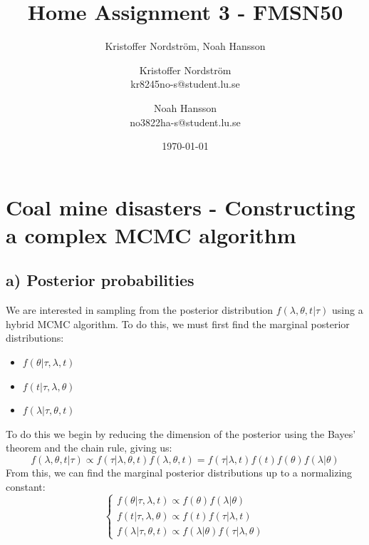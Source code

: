 \documentclass[a4paper]{article}
\title{Home Assignment 3 - FMSN50}
\author{Kristoffer Nordström, Noah Hansson}\author{Kristoffer Nordström \\ kr8245no-s@student.lu.se \and  Noah Hansson \\ no3822ha-s@student.lu.se}
\date{\today}
\begin{document}
\maketitle
\newpage

\section*{Coal mine disasters - Constructing a complex MCMC algorithm}


\subsection*{a) Posterior probabilities}
We are interested in sampling from the posterior distribution $f(\lambda, \theta, t | \tau)$ using a hybrid MCMC algorithm. To do this, we must first find the marginal posterior distributions:
\begin{itemize}
    \item $f(\theta | \tau, \lambda, t)$
    \item $f(t | \tau, \lambda, \theta)$
    \item $f(\lambda | \tau, \theta, t)$
\end{itemize}

To do this we begin by reducing the dimension of the posterior using the Bayes' theorem and the chain rule, giving us:
\begin{equation}
    f(\lambda, \theta, t | \tau) \propto f(\tau|\lambda, \theta, t)f(\lambda, \theta,t) = f(\tau|\lambda,t)f(t)f(\theta)f(\lambda|\theta)
\end{equation}
From this, we can find the marginal posterior distributions up to a normalizing constant:
\begin{equation}
    \begin{cases}
        f(\theta | \tau, \lambda, t) \propto f(\theta)f(\lambda|\theta) \\
        f(t | \tau, \lambda, \theta) \propto f(t)f(\tau|\lambda,t) \\
        f(\lambda | \tau, \theta, t) \propto f(\lambda|\theta)f(\tau|\lambda,\theta)
    \end{cases}
\end{equation}
\end{document}
